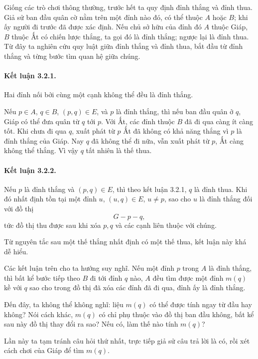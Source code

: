\documentclass[11pt]{article}
\begin{document}
Giống các trò chơi thông thường, trước hết ta quy định đỉnh thắng và đỉnh
thua. Giả sử ban đầu quân cờ nằm trên một đỉnh nào đó, có thể thuộc \(A\) hoặc
\(B\); khi ấy người đi trước đã được xác định. Nếu chủ sở hữu của đỉnh đó
\(A\) thuộc Giáp, \(B\) thuộc Ất có chiến lược thắng, ta gọi đó là đỉnh thắng;
ngược lại là đỉnh thua. Từ đây ta nghiên cứu quy luật giữa đỉnh thắng và đỉnh
thua, bắt đầu từ đỉnh thắng và từng bước tìm quan hệ giữa chúng.

\paragraph{Kết luận 3.2.1.}
Hai đỉnh nối bởi cùng một cạnh không thể đều là đỉnh thắng.

Nếu \(p\in A\), \(q\in B\), \((p,q)\in E\), và \(p\) là đỉnh thắng, thì nếu
ban đầu quân ở \(q\), Giáp có thể đưa quân từ \(q\) tới \(p\). Với Ất, các
đỉnh thuộc \(B\) đã đi qua càng ít càng tốt. Khi chưa đi qua \(q\), xuất phát
từ \(p\) Ất đã không có khả năng thắng vì \(p\) là đỉnh thắng của Giáp. Nay
\(q\) đã không thể đi nữa, vẫn xuất phát từ \(p\), Ất càng không thể thắng.
Vì vậy \(q\) tất nhiên là thế thua.

\paragraph{Kết luận 3.2.2.}
Nếu \(p\) là đỉnh thắng và \((p,q)\in E\), thì theo kết luận 3.2.1, \(q\) là
đỉnh thua. Khi đó nhất định tồn tại một đỉnh \(u\), \((u,q)\in E\), \(u\ne p\),
sao cho \(u\) là đỉnh thắng đối với đồ thị
\[
  G-p-q,
\]
tức đồ thị thu được sau khi xóa \(p,q\) và các cạnh liên thuộc với chúng.

Từ nguyên tắc sau một thế thắng nhất định có một thế thua, kết luận này khá dễ
hiểu.

Các kết luận trên cho ta hướng suy nghĩ. Nếu một đỉnh \(p\) trong \(A\) là
đỉnh thắng, thì bất kể bước tiếp theo \(B\) đi tới đỉnh \(q\) nào, \(A\) đều
tìm được một đỉnh \(m(q)\) kề với \(q\) sao cho trong đồ thị đã xóa các đỉnh
đã đi qua, đỉnh ấy là đỉnh thắng.

Đến đây, ta không thể không nghĩ: liệu \(m(q)\) có thể được tính ngay từ đầu
hay không? Nói cách khác, \(m(q)\) có chỉ phụ thuộc vào đồ thị ban đầu không,
bất kể sau này đồ thị thay đổi ra sao? Nếu có, làm thế nào tính \(m(q)\)?

Lần này ta tạm tránh câu hỏi thứ nhất, trực tiếp giả sử câu trả lời là có, rồi
xét cách chơi của Giáp để tìm \(m(q)\).
\end{document}
